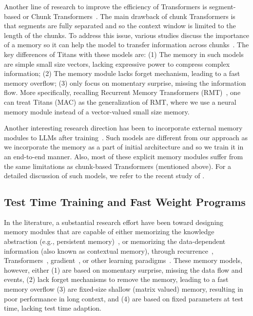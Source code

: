 \documentclass{article}
\newcommand{\citep}{\parencite}
\newcommand{\citet}{\textcite}
\newcommand{\head}[1]{\vspace{1.7mm}\noindent{{\textcolor{c3}{\bf #1.}}}}
\begin{document}
\head{Segment-based Transformers}
Another line of research to improve the efficiency of Transformers is segment-based or Chunk Transformers~\citep{dai2019transformerxl}. The main drawback of chunk Transformers is that segments are fully separated and so the context window is limited to the length of the chunks. To address this issue, various studies discuss the importance of a memory so it can help the model to transfer information across chunks~\citep{bulatov2022recurrent, rodkin2024associative, wu2020memformer, zancato2024bmojo, hutchins2022block, feng2022learn, hutchins2022block, bulatov2023scaling, wang2019r, wu2020memformer, zancato2024bmojo}. The key differences of Titans with these models are: (1) The memory in such models are simple small size vectors, lacking expressive power to compress complex information; (2) The memory module lacks forget mechanism, leading to a fast memory overflow; (3) only focus on momentary surprise, missing the information flow. More specifically, recalling Recurrent Memory Transformers (RMT)~\citep{bulatov2022recurrent, rodkin2024associative, bulatov2023scaling}, one can treat Titans (MAC) as the generalization of RMT, where we use a neural memory module instead of a vector-valued small size memory. 

\head{Memory for Large Language Models}
Another interesting research direction has been to incorporate external memory modules to LLMs after training~\citep{he2024camelot, Khandelwal2020Generalization, wang2024memoryllm}. Such models are different from our approach as we incorporate the memory as a part of initial architecture and so we train it in an end-to-end manner. Also, most of these explicit memory modules suffer from the same limitations as chunk-based Transformers (mentioned above). For a detailed discussion of such models, we refer to the recent study of \citet{wang2024towards}.

\subsection{Test Time Training and Fast Weight Programs}

\head{Memory Design and Augmentation with Memory} 
In the literature, a substantial research effort have been toward designing memory modules that are capable of either memorizing the knowledge abstraction (e.g., persistent memory)~\citep{sukhbaatar2019augmenting}, or memorizing the data-dependent information (also known as contextual memory), through recurrence~\citep{zancato2024bmojo, bulatov2022recurrent, rodkin2024associative}, Transformers~\citep{munkhdalai2024leave, zhang2024memory, cetin2024evolved, berges2024memory, le2020self, feng2022learn}, gradient~\citep{munkhdalai2019metalearned, irie2022dual}, or other learning paradigms~\citep{weston2014memory, sukhbaatar2015end}. These memory models, however, either (1) are based on momentary surprise, missing the data flow and events,   (2) lack forget mechanisms to remove the memory, leading to a fast memory overflow (3) are fixed-size shallow (matrix valued) memory, resulting in poor performance in long context, and (4) are based on fixed parameters at test time, lacking test time adaption. 
\end{document}
